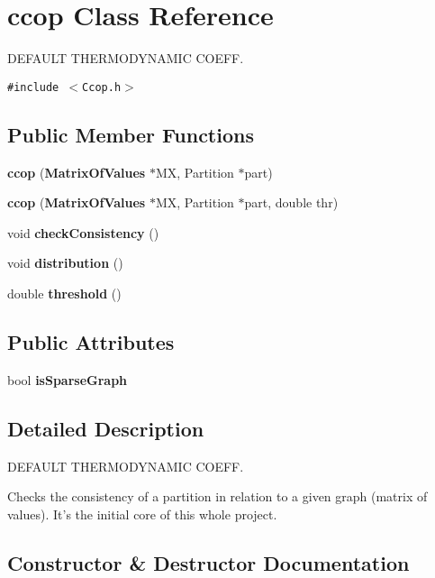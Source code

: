\section{ccop Class Reference}
\label{classccop}
DEFAULT THERMODYNAMIC COEFF.  


{\tt \#include $<$Ccop.h$>$}

\subsection*{Public Member Functions}
\begin{CompactItemize}
\item 
{\bf ccop} ({\bf Matrix\-Of\-Values} $\ast$MX, Partition $\ast$part)
\item 
{\bf ccop} ({\bf Matrix\-Of\-Values} $\ast$MX, Partition $\ast$part, double thr)\label{classccop_a1}

\item 
void {\bf check\-Consistency} ()\label{classccop_a2}

\item 
void {\bf distribution} ()\label{classccop_a3}

\item 
double {\bf threshold} ()\label{classccop_a4}

\end{CompactItemize}
\subsection*{Public Attributes}
\begin{CompactItemize}
\item 
bool {\bf is\-Sparse\-Graph}\label{classccop_o0}

\end{CompactItemize}


\subsection{Detailed Description}
DEFAULT THERMODYNAMIC COEFF. 

Checks the consistency of a partition in relation to a given graph (matrix of values). It's the initial core of this whole project. 



\subsection{Constructor \& Destructor Documentation}
